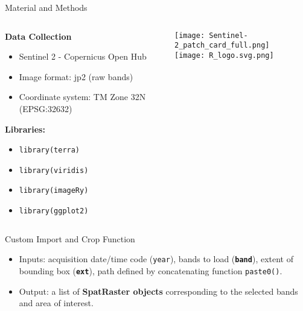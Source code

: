\documentclass{beamer}
\begin{document}
\begin{frame}{Material and Methods}
\begin{columns}
    \begin{column}{0.6\textwidth}
        \centering
        \textbf{Data Collection}
        \begin{itemize}
            \item Sentinel 2 - Copernicus Open Hub
            \item Image format: jp2 (raw bands)
            \item Coordinate system: TM Zone 32N (EPSG:32632)
        \end{itemize}

        \textbf{Libraries:} 
        \begin{itemize}
            \item    \texttt{library(terra)} 
            \item    \texttt{library(viridis)} 
            \item    \texttt{library(imageRy)} 
            \item    \texttt{library(ggplot2)} 
        \end{itemize}
    \end{column}

    \begin{column}{0.4\textwidth}
        \centering
        \texttt{[image: Sentinel-2\_patch\_card\_full.png]}\\ \bigskip
        \texttt{[image: R\_logo.svg.png]}
    \end{column}
\end{columns}
\end{frame}

\begin{frame}{Custom Import and Crop Function}
    \begin{itemize}
        \item Inputs: acquisition date/time code (\texttt{year}), bands to load (\textbf{\texttt{band}}), extent of bounding box (\textbf{\texttt{ext}}), path defined by concatenating function \texttt{paste0()}. 
        \item Output: a list of \textbf{SpatRaster objects} corresponding to the selected bands and area of interest.
    \end{itemize}
      
    
\end{frame}
\end{document}
